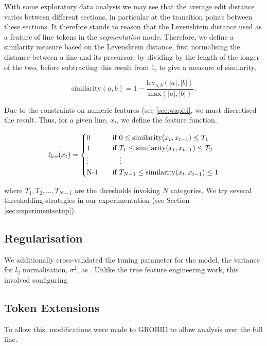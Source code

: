 With some exploratory data analysis we may see that the average edit distance varies between different sections, in particular at the transition points between these sections. It therefore stands to reason that the Levenshtein distance used as a feature of line tokens in the \emph{segmentation} mode. Therefore, we define a similarity measure based on the Levenshtein distance, first normalising the distance between a line and its precursor, by dividing by the length of the longer of the two, before subtracting this result from 1, to give a measure of similarity,

\begin{equation}
\text{similarity}(a, b) = 1 - \frac{\text{lev}_{a, b}(|a|, |b|)}{\text{max}(|a|, |b|)}.
\label{eq:levenshteinsimilarity}
\end{equation}

Due to the constraints on numeric features (see \ref{sec:wapiti}, we must discretised the result. Thus, for a given line, $x_t$, we define the feature function, 

\begin{equation}
  \text{f}_{lev}(x_t) =
  \begin{cases}
  	0 & \quad \text{if } 0 \leq \text{similarity}(x_t, x_{t-1}) \leq T_1 \\
	1 & \quad \text{if } T_1 \leq \text{similarity}(x_t, x_{t-1}) \leq T_2\\
	\vdots & \qquad \vdots \\
	$N-1$ & \quad \text{if } T_{N-1} \leq \text{similarity}(x_t, x_{t-1}) \leq 1 \\
  \end{cases}
\label{eq:levenshteinfunction}
\end{equation}

where $T_1, T_2, ..., T_{N-1}$ are the thresholds invoking $N$ categories. We try several thresholding strategies in our experimentation (see Section \ref{sec:experimentsetup}).

\subsection{Regularisation}

We additionally cross-validated the tuning parameter for the model, the variance for $l_2$ normalisation, $\sigma^2$, as . Unlike the true feature engineering work, this involved configuring 





\subsection{Token Extensions}

To allow this, modifications were made to GROBID to allow analysis over the full line.

